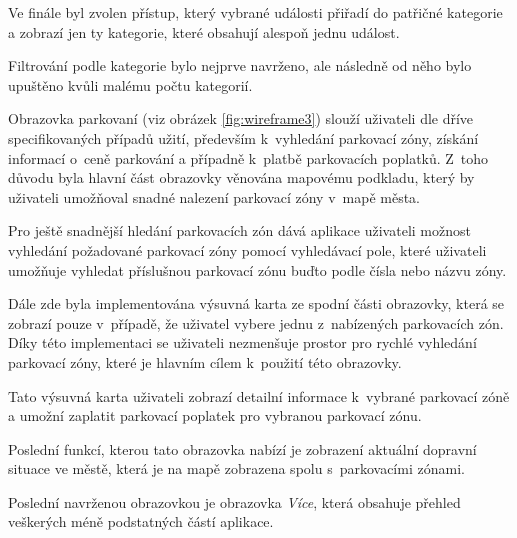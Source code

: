 \begin{minipage}[t]{0.45\textwidth}
  Ve finále byl zvolen přístup, který vybrané události přiřadí do patřičné kategorie a zobrazí jen ty kategorie, které obsahují alespoň jednu událost.

  Filtrování podle kategorie bylo nejprve navrženo, ale následně od něho bylo upuštěno kvůli malému počtu kategorií.
  




Obrazovka parkovaní (viz obrázek \ref{fig:wireframe3}) slouží uživateli dle dříve specifikovaných případů užití, především k~vyhledání parkovací zóny, 
získání informací o~ceně parkování a případně k~platbě parkovacích poplatků. Z~toho důvodu byla hlavní část obrazovky věnována mapovému podkladu, 
který by uživateli umožňoval snadné nalezení parkovací zóny v~mapě města. %


Pro ještě snadnější hledání parkovacích zón dává aplikace uživateli možnost vyhledání požadované parkovací zóny pomocí vyhledávací pole, které 
uživateli umožňuje vyhledat příslušnou parkovací zónu buďto podle čísla nebo názvu zóny. 

Dále zde byla implementována výsuvná karta ze spodní části obrazovky, která se zobrazí pouze v~případě, že uživatel vybere jednu
z~nabízených parkovacích zón. Díky této implementaci se uživateli nezmenšuje prostor pro rychlé vyhledání parkovací zóny,
které je hlavním cílem k~použití této obrazovky. 

Tato výsuvná karta uživateli zobrazí detailní informace k~vybrané parkovací zóně a umožní zaplatit parkovací poplatek pro vybranou parkovací zónu.

Poslední funkcí, kterou tato obrazovka nabízí je zobrazení aktuální dopravní situace ve městě, která je na mapě zobrazena spolu s~parkovacími zónami.

\bigskip
{}
Poslední navrženou obrazovkou je obrazovka \textit{Více}, která obsahuje přehled veškerých méně podstatných částí aplikace.







\end{minipage}
